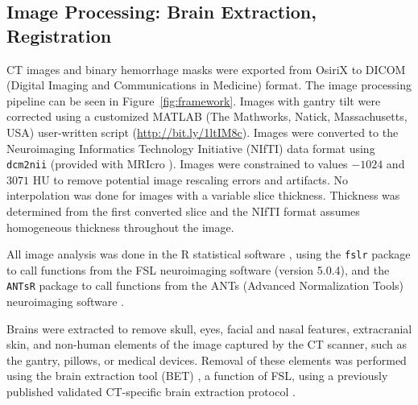 \documentclass{elsarticle_nonatbib}\usepackage[]{graphicx}\usepackage[]{color}
\newcommand{\pkg}[1]{\texttt{#1}}
\newcommand{\code}[1]{\texttt{#1}}
\begin{document}
\subsection{Image Processing: Brain Extraction, Registration}
CT images and binary hemorrhage masks were exported from OsiriX to DICOM (Digital Imaging and Communications in Medicine) format.   The image processing pipeline can be seen in Figure~\ref{fig:framework}.   Images with gantry tilt were corrected using a customized MATLAB (The Mathworks, Natick, Massachusetts, USA) user-written script ({\scriptsize \url{http://bit.ly/1ltIM8c}}). Images were converted to the Neuroimaging Informatics Technology Initiative (NIfTI) data format using \code{dcm2nii} (provided with MRIcro \citep{rorden_stereotaxic_2000}).  Images were constrained to values $-1024$ and $3071$ HU to remove potential image rescaling errors and artifacts.   No interpolation was done for images with a variable slice thickness. Thickness was determined from the first converted slice and the NIfTI format assumes homogeneous thickness throughout the image.  

All image analysis was done in the R statistical software \citep{RCORE}, using the \pkg{fslr} \citep{muschelli2015fslr} package to call functions from the FSL \citep{jenkinson_fsl_2012} neuroimaging software (version 5.0.4), and the \pkg{ANTsR} package to call functions from the ANTs (Advanced Normalization Tools) neuroimaging software \citep{avants_reproducible_2011}.

Brains were extracted to remove skull, eyes, facial and nasal features, extracranial skin, and non-human elements of the image captured by the CT scanner, such as the gantry, pillows, or medical devices.  Removal of these elements was performed using the brain extraction tool (BET) \citep{smith_fast_2002}, a function of FSL, using a previously published validated CT-specific brain extraction protocol \citep{muschelli_validated_2015}.  
\end{document}
